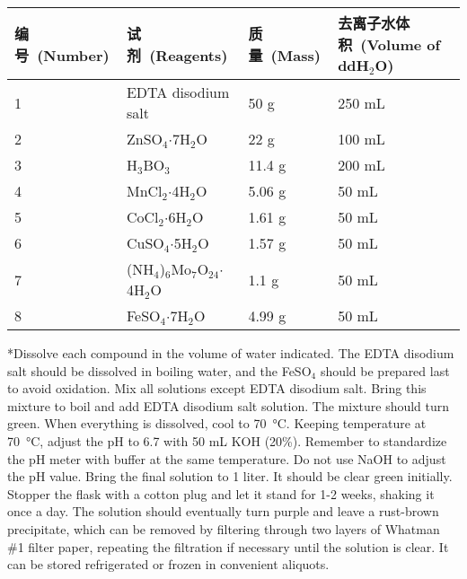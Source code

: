 \begin{table}[htbp]
\small
\centering
{
\par}
\begin{tabular*}{\textwidth}[c]{@{\extracolsep{\fill}}llll}
\toprule
编号\ (Number) & 试剂\ (Reagents) & 质量\ (Mass)  & 去离子水体积\ (Volume of ddH$_2$O)\\
\midrule
1 & EDTA disodium salt   & 50 g  & 250 mL\\
2 & ZnSO$_4$$\cdot$7H$_2$O           &22 g   & 100 mL\\
3 & H$_3$BO$_3$                &11.4 g & 200 mL\\
4 & MnCl$_2$$\cdot$4H$_2$O           &5.06 g & 50 mL\\
5 & CoCl$_2$$\cdot$6H$_2$O           &1.61 g & 50 mL\\
6 & CuSO$_4$$\cdot$5H$_2$O           &1.57 g & 50 mL\\
7 & (NH$_4$)$_6$Mo$_7$O$_{24}$$\cdot$4H$_2$O    &1.1 g  & 50 mL\\
8 & FeSO$_4$$\cdot$7H$_2$O           &4.99 g & 50 mL\\
\bottomrule
\end{tabular*}
\end{table}
*Dissolve each compound in the volume of water indicated. The EDTA disodium salt should be dissolved in boiling water, and the FeSO$_4$ should be prepared last to avoid oxidation. Mix all solutions except EDTA disodium salt. Bring this mixture to boil and add EDTA disodium salt solution. The mixture should turn green. When everything is dissolved, cool to \SI{70}{\degreeCelsius}. Keeping temperature at \SI{70}{\degreeCelsius}, adjust the pH to 6.7 with 50 mL KOH (20\%). Remember to standardize the pH meter with buffer at the same temperature. Do not use NaOH to adjust the pH value. Bring the final solution to 1 liter. It should be clear green initially. Stopper the flask with a cotton plug and let it stand for 1-2 weeks, shaking it once a day. The solution should eventually turn purple and leave a rust-brown precipitate, which can be removed by filtering through two layers of Whatman \#1 filter paper, repeating the filtration if necessary until the solution is clear. It can be stored refrigerated or frozen in convenient aliquots.

